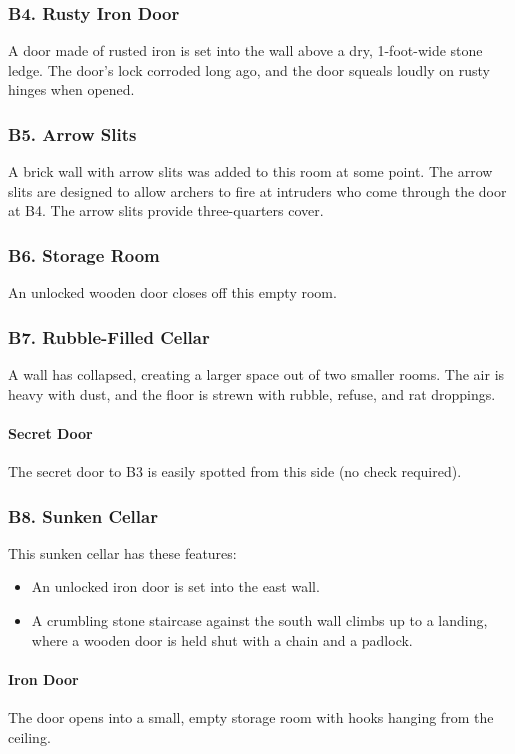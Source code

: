 \documentclass[10pt,a4paper,twoside,twocolumn,openany,nodeprecatedcode]{dndbook}
\begin{document}
\subsubsection{B4. Rusty Iron Door}
A door made of rusted iron is set into the wall above a dry, 1-foot-wide stone ledge. The door's lock corroded long ago, and the door squeals loudly on rusty hinges when opened.
\subsubsection{B5. Arrow Slits}
A brick wall with arrow slits was added to this room at some point. The arrow slits are designed to allow archers to fire at intruders who come through the door at B4. The arrow slits provide three-quarters cover.
\subsubsection{B6. Storage Room}
An unlocked wooden door closes off this empty room.
\subsubsection{B7. Rubble-Filled Cellar}
A wall has collapsed, creating a larger space out of two smaller rooms. The air is heavy with dust, and the floor is strewn with rubble, refuse, and rat droppings.
\paragraph{Secret Door}
The secret door to B3 is easily spotted from this side (no check required).
\subsubsection{B8. Sunken Cellar}
This sunken cellar has these features:
\begin{itemize}

\item An unlocked iron door is set into the east wall.
\item A crumbling stone staircase against the south wall climbs up to a landing, where a wooden door is held shut with a chain and a padlock.
\end{itemize}


\paragraph{Iron Door}
The door opens into a small, empty storage room with hooks hanging from the ceiling.
\end{document}

